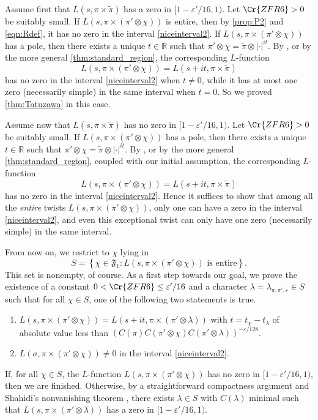 \documentclass[12pt]{amsart}
\theoremstyle{definition}
\theoremstyle{remark}
\numberwithin{equation}{section}
\theoremstyle{plain}
\renewcommand{\tilde}{\widetilde}
\renewcommand{\epsilon}{\varepsilon}
\newcommand{\R}{\mathbb{R}}
\begin{document}
Assume first that $L(s,\pi\times\tilde\pi)$ has a zero in $[1-\epsilon'/16,1)$. Let $\Cr{ZFR6}>0$ be suitably small. If $L(s,\pi\times(\pi'\otimes\chi))$ is entire, then by \cref{prop:P2} and \eqref{eqn:Rdef}, it has no zero in the interval \eqref{niceinterval2}. If $L(s,\pi\times(\pi'\otimes\chi))$ has a pole, then there exists a unique $t\in\R$ such that $\pi'\otimes\chi=\tilde\pi\otimes|\cdot|^{it}$.
By \cite[Theorem~5.1]{HumphriesThorner}, or by the more general \cref{thm:standard_region}, the corresponding $L$-function
\[L(s,\pi\times(\pi'\otimes\chi))=L(s+it,\pi\times\tilde\pi)\]
has no zero in the interval \eqref{niceinterval2} when $t\neq 0$, while it has at most one zero (necessarily simple) in the same interval when $t=0$. So we proved \cref{thm:Tatuzawa} in this case.

Assume now that $L(s,\pi\times\tilde\pi)$ has no zero in $[1-\epsilon'/16,1)$. Let $\Cr{ZFR6}>0$ be suitably small. If $L(s,\pi\times(\pi'\otimes\chi))$ has a pole, then there exists a unique $t\in\R$ such that $\pi'\otimes\chi=\tilde\pi\otimes|\cdot|^{it}$.
By \cite[Theorem~5.1]{HumphriesThorner}, or by the more general \cref{thm:standard_region}, coupled with our initial assumption, the corresponding $L$-function
\[L(s,\pi\times(\pi'\otimes\chi))=L(s+it,\pi\times\tilde\pi)\]
has no zero in the interval \eqref{niceinterval2}. Hence it suffices to show that among all the \emph{entire} twists $L(s,\pi\times(\pi'\otimes\chi))$, only one can have a zero in the interval \eqref{niceinterval2}, and even this exceptional twist can only have one zero (necessarily simple) in the same interval.

From now on, we restrict to $\chi$ lying in
\[
S=\left\{\chi\in\mathfrak{F}_1:\text{$L(s,\pi\times(\pi'\otimes\chi))$ is entire}\right\}.
\]
This set is nonempty, of course. As a first step towards our goal, we prove the existence of a constant $0<\Cr{ZFR6}\leq\epsilon'/16$ and a character $\lambda=\lambda_{\pi,\pi',\epsilon}\in S$ such that for all $\chi\in S$, one of the following two statements is true.
\begin{enumerate}
	\item $L(s,\pi\times(\pi'\otimes\chi))=L(s+it,\pi\times(\pi'\otimes\lambda))$ 
	with $t=t_\chi-t_\lambda$ of absolute value less than $(C(\pi)C(\pi'\otimes\chi)C(\pi'\otimes\lambda))^{-\epsilon/128}$.
	\item $L(\sigma,\pi\times(\pi'\otimes\chi))\neq 0$ in the interval \eqref{niceinterval2}.
\end{enumerate}
If, for all $\chi\in S$, the $L$-function $L(s,\pi\times(\pi'\otimes\chi))$ has no zero in $[1-\epsilon'/16,1)$, then we are finished. Otherwise, by 
a straightforward compactness argument and Shahidi's nonvanishing theorem \cite[Theorem~5.2]{Shahidi}, there exists $\lambda\in S$ with $C(\lambda)$ minimal such that $L(s,\pi\times(\pi'\otimes\lambda))$ has a zero in $[1-\epsilon'/16,1)$.
\end{document}
